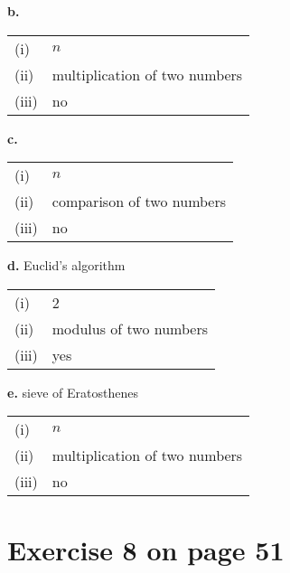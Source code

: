 \documentclass[11pt]{article}
\begin{document}
\textbf{b.} 


\begin{center}
\begin{tabular}{ll}
 (i)    &  \(n\)                          \\
 (ii)   &  multiplication of two numbers  \\
 (iii)  &  no                             \\
\end{tabular}
\end{center}



\textbf{c.} 


\begin{center}
\begin{tabular}{ll}
 (i)    &  \(n\)                      \\
 (ii)   &  comparison of two numbers  \\
 (iii)  &  no                         \\
\end{tabular}
\end{center}



\textbf{d.} Euclid's algorithm


\begin{center}
\begin{tabular}{ll}
 (i)    &  2                       \\
 (ii)   &  modulus of two numbers  \\
 (iii)  &  yes                     \\
\end{tabular}
\end{center}



\textbf{e.} sieve of Eratosthenes


\begin{center}
\begin{tabular}{ll}
 (i)    &  \(n\)                          \\
 (ii)   &  multiplication of two numbers  \\
 (iii)  &  no                             \\
\end{tabular}
\end{center}




\section*{Exercise 8 on page 51}
\label{sec-3}
\end{document}
